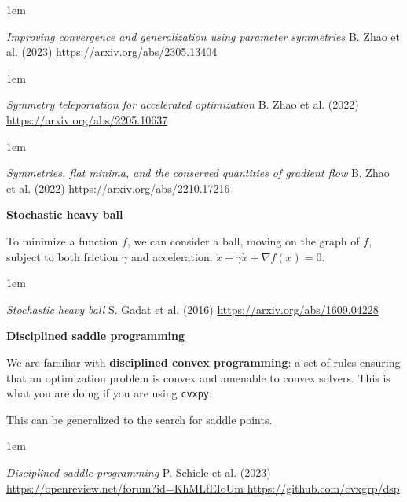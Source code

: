 \documentclass[a5paper]{article}
\let\d\textbf
\newenvironment{reference}{%
  \medskip\goodbreak
  \parskip 0pt
  \raggedright
  \leftskip 1em
  \obeylines
}{\par\medskip\goodbreak}
\def\section#1{\clearpage{\vspace*{0cm}\LARGE\centering\bfseries #1\par\bigskip\bigskip}}
\def\subsection#1{{\par\bigskip\goodbreak\large\bfseries #1\par}}
\begin{document}
\begin{reference}
  \emph{Improving convergence and generalization using parameter symmetries}
  B. Zhao et al. (2023)
  \url{https://arxiv.org/abs/2305.13404}
\end{reference}

\begin{reference}
  \emph{Symmetry teleportation for accelerated optimization }
  B. Zhao et al. (2022)
  \url{https://arxiv.org/abs/2205.10637}
\end{reference}

\begin{reference}
  \emph{Symmetries, flat minima, and the conserved quantities of gradient flow}
  B. Zhao et al. (2022)
  \url{https://arxiv.org/abs/2210.17216}
\end{reference}

\subsection{Stochastic heavy ball}

To minimize a function $f$, we can consider a ball,
moving on the graph of $f$, subject to both friction $\gamma$ and acceleration: 
$\ddot x + \gamma \dot x + \nabla f(x) = 0. $

\begin{reference}
  \emph{Stochastic heavy ball}
  S. Gadat et al. (2016)
  \url{https://arxiv.org/abs/1609.04228}
\end{reference}

\subsection{Disciplined saddle programming}

We are familiar with \d{disciplined convex programming}:
a set of rules ensuring that an optimization problem is convex
and amenable to convex solvers.
This is what you are doing if you are using \texttt{cvxpy}.

This can be generalized to the search for saddle points.

\begin{reference}
  \emph{Disciplined saddle programming}
  P. Schiele et al. (2023)
  \url{https://openreview.net/forum?id=KhMLfEIoUm  }
  \url{https://github.com/cvxgrp/dsp}
\end{reference}

\section{Finance}
\end{document}
